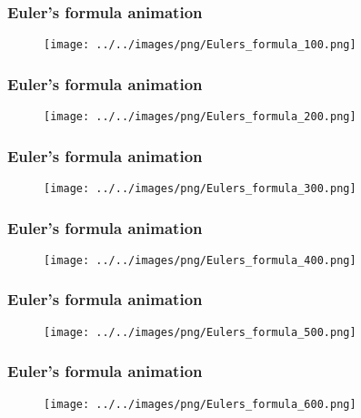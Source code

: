 \begin{frame}[t]

	\frametitle{Euler's formula animation}

	\begin{figure}
		\texttt{[image: ../../images/png/Eulers\_formula\_100.png]}
	\end{figure}

\end{frame}

\begin{frame}[t]

	\frametitle{Euler's formula animation}

	\begin{figure}
		\texttt{[image: ../../images/png/Eulers\_formula\_200.png]}
	\end{figure}

\end{frame}

\begin{frame}[t]

	\frametitle{Euler's formula animation}

	\begin{figure}
		\texttt{[image: ../../images/png/Eulers\_formula\_300.png]}
	\end{figure}

\end{frame}

\begin{frame}[t]

	\frametitle{Euler's formula animation}

	\begin{figure}
		\texttt{[image: ../../images/png/Eulers\_formula\_400.png]}
	\end{figure}

\end{frame}

\begin{frame}[t]

	\frametitle{Euler's formula animation}

	\begin{figure}
		\texttt{[image: ../../images/png/Eulers\_formula\_500.png]}
	\end{figure}

\end{frame}

\begin{frame}[t]

	\frametitle{Euler's formula animation}

	\begin{figure}
		\texttt{[image: ../../images/png/Eulers\_formula\_600.png]}
	\end{figure}

\end{frame}

